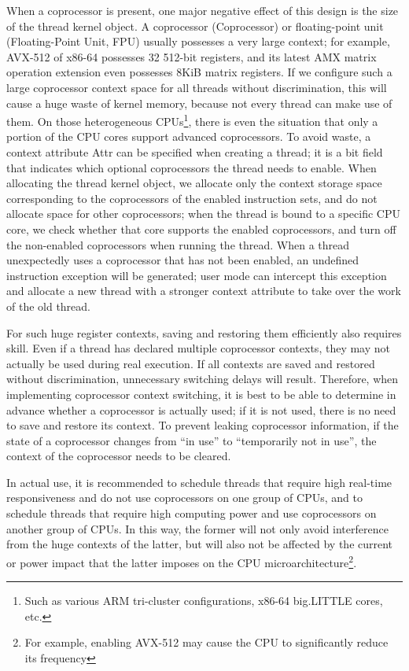 \begin{enumerate}
  When a coprocessor is present, one major negative effect of this design is the size of the thread kernel object. A coprocessor (Coprocessor) or floating-point unit (Floating-Point
  Unit, FPU) usually possesses a very large context; for example, AVX-512 of x86-64 possesses 32 512-bit registers, and its latest AMX matrix operation extension even possesses 8KiB matrix registers. If we configure such a large coprocessor context space for all threads without discrimination, this will cause a huge waste of kernel memory, because not every thread can make use of them. On those heterogeneous CPUs\footnote{Such as various ARM tri-cluster configurations, x86-64 big.LITTLE cores, etc.}, there is even the situation that only a portion of the CPU cores support advanced coprocessors. To avoid waste, a context attribute Attr can be specified when creating a thread; it is a bit field that indicates which optional coprocessors the thread needs to enable. When allocating the thread kernel object, we allocate only the context storage space corresponding to the coprocessors of the enabled instruction sets, and do not allocate space for other coprocessors; when the thread is bound to a specific CPU core, we check whether that core supports the enabled coprocessors, and turn off the non-enabled coprocessors when running the thread. When a thread unexpectedly uses a coprocessor that has not been enabled, an undefined instruction exception will be generated; user mode can intercept this exception and allocate a new thread with a stronger context attribute to take over the work of the old thread.

  For such huge register contexts, saving and restoring them efficiently also requires skill. Even if a thread has declared multiple coprocessor contexts, they may not actually be used during real execution. If all contexts are saved and restored without discrimination, unnecessary switching delays will result. Therefore, when implementing coprocessor context switching, it is best to be able to determine in advance whether a coprocessor is actually used; if it is not used, there is no need to save and restore its context. To prevent leaking coprocessor information, if the state of a coprocessor changes from ``in use'' to ``temporarily not in use'', the context of the coprocessor needs to be cleared.

  In actual use, it is recommended to schedule threads that require high real-time responsiveness and do not use coprocessors on one group of CPUs, and to schedule threads that require high computing power and use coprocessors on another group of CPUs. In this way, the former will not only avoid interference from the huge contexts of the latter, but will also not be affected by the current or power impact that the latter imposes on the CPU microarchitecture\footnote{For example, enabling AVX-512 may cause the CPU to significantly reduce its frequency}.


\end{enumerate}
